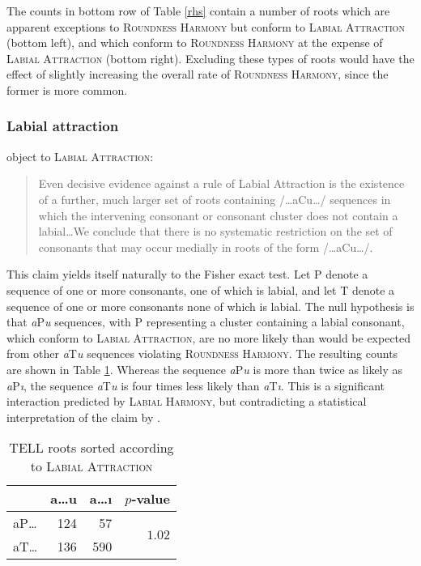\noindent
The counts in bottom row of Table \ref{rhs} contain a number of roots which are apparent exceptions to \textsc{Roundness Harmony} but conform to \textsc{Labial Attraction} (bottom left), and which conform to \textsc{Roundness Harmony} at the expense of \textsc{Labial Attraction} (bottom right). Excluding these types of roots would have the effect of slightly increasing the overall rate of \textsc{Roundness Harmony}, since the former is more common.

\subsubsection{Labial attraction}

\citet{Clements1982} object to \textsc{Labial Attraction}:

\begin{quote}
Even decisive evidence against a rule of Labial Attraction is the existence of a further, much larger set of roots containing /\ldots{}aCu\ldots/ sequences in which the intervening consonant or consonant cluster does not contain a labial\ldots{}We conclude that there is no systematic restriction on the set of consonants that may occur medially in roots of the form /\ldots{}aCu\ldots/. \citep[225]{Clements1982}
\end{quote}

\noindent 
This claim yields itself naturally to the Fisher exact test. Let P denote a sequence of one or more consonants, one of which is labial, and let T denote a sequence of one or more consonants none of which is labial. The null hypothesis is that \emph{a}P\emph{u} sequences, with P representing a cluster containing a labial consonant, which conform to \textsc{Labial Attraction}, are no more likely than would be expected from other \emph{a}T\emph{u} sequences violating \textsc{Roundness Harmony}. The resulting counts are shown in Table \ref{las}. Whereas the sequence \emph{a}P\emph{u} is more than twice as likely as \emph{a}P\emph{ı}, the sequence \emph{a}T\emph{u} is four times less likely than \emph{a}T\emph{ı}. This is a significant interaction predicted by \textsc{Labial Harmony}, but contradicting a statistical interpretation of the claim by \citeauthor{Clements1982}.

\begin{table}
\centering
\begin{tabular}{lrrr}
\toprule
       & a\ldots{}u & a\ldots{}ı & $p$-value                      \\
\midrule
aP\ldots{} & 124    & 57     & \multirow{2}{*}{$1.02$\e{-36}} \\
aT\ldots{} & 136    & 590    &                                \\
\bottomrule
\end{tabular}
\caption{TELL roots sorted according to \textsc{Labial Attraction}}
\label{las}
\end{table}

